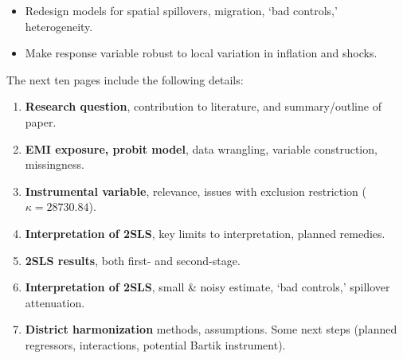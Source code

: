 \documentclass[letterpaper,12pt]{article}
\begin{document}
\begin{enumerate}
\begin{itemize}
\vspace{-1mm}

\item Redesign models for spatial spillovers, migration, `bad controls,' heterogeneity. 

\vspace{-1mm}

\item Make response variable robust to local variation in inflation and shocks.
\end{itemize}
\vspace{1mm}


\end{enumerate}


\noindent The next ten pages include the following details: 

\begin{enumerate}
\item[6:] \textbf{Research question}, contribution to literature, and summary/outline of paper.
\item[10-11:] \textbf{EMI exposure, probit model}, data wrangling, variable construction, missingness.
\item[23:] \textbf{Instrumental variable}, relevance, issues with exclusion restriction ($\kappa=28730.84$).
\item[25:] \textbf{Interpretation of 2SLS}, key limits to interpretation, planned remedies.
\item[26-27:] \textbf{2SLS results}, both first- and second-stage.
\item[28:] \textbf{Interpretation of 2SLS}, small \& noisy estimate, `bad controls,' spillover attenuation. 
\item[32-33:] \textbf{District harmonization}  methods, assumptions. Some next steps (planned regressors, interactions, potential Bartik instrument).

\end{enumerate}
\end{document}
